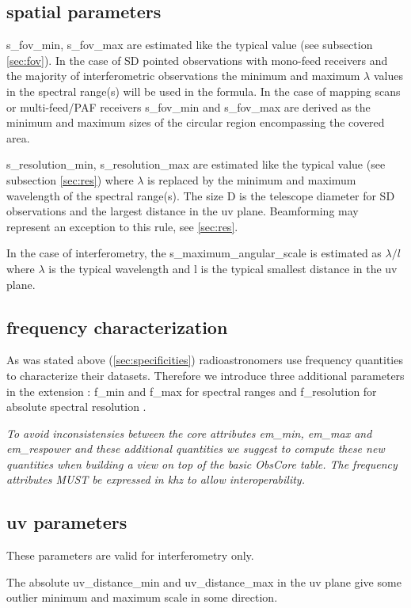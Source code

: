 \documentclass[11pt,a4paper]{ivoa}
\begin{document}
\subsection{spatial parameters}
s\_fov\_min, s\_fov\_max are estimated like the typical value (see subsection \ref{sec:fov}). 
In the case of SD pointed observations with mono-feed receivers and the majority of interferometric observations the minimum and maximum $\lambda$ values in the spectral range(s) will be used in the formula. In the case of mapping scans or multi-feed/PAF receivers s\_fov\_min and s\_fov\_max are derived as the minimum and maximum sizes of the circular region encompassing the covered area.

s\_resolution\_min, s\_resolution\_max are estimated like the typical value (see subsection \ref{sec:res}) where $\lambda$ is replaced by the minimum and maximum wavelength of the spectral range(s). The size D is the telescope diameter for SD observations and the largest distance in the uv plane. Beamforming may represent an exception to this rule, see \ref{sec:res}.

In the case of interferometry, the s\_maximum\_angular\_scale is estimated as $\lambda/l$ where $\lambda$ is the typical 
wavelength and l is the typical smallest distance in the uv plane. 

\subsection{frequency characterization}

As was stated above (\ref{sec:specificities}) radioastronomers use frequency quantities to characterize their datasets. Therefore we introduce three additional parameters in the extension : f\_min and f\_max for spectral ranges and f\_resolution for absolute spectral resolution .

\textit{To avoid inconsistensies between the core attributes em\_min, em\_max and em\_respower and these additional quantities we suggest to compute these new quantities when building a view on top of the basic ObsCore table. The frequency attributes MUST be expressed in khz to allow interoperability.} 
\subsection{uv parameters}
These parameters are valid for interferometry only.

The absolute uv\_distance\_min and uv\_distance\_max  in the uv plane give some outlier minimum and maximum scale in some direction.
\end{document}
